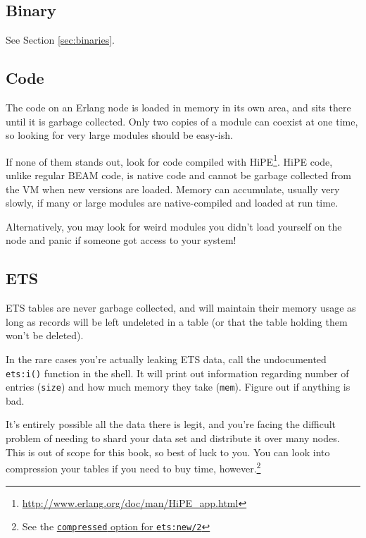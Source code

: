 \documentclass[11pt, oneside]{book}   	%
\newcommand{\function}[1]{\Verb`#1`}
\newcommand{\expression}[1]{\Verb`#1`}
\begin{document}
\subsection{Binary}

See Section \ref{sec:binaries}.

\subsection{Code}

The code on an Erlang node is loaded in memory in its own area, and sits there until it is garbage collected. Only two copies of a module can coexist at one time, so looking for very large modules should be easy-ish.

If none of them stands out, look for code compiled with HiPE\footnote{\href{http://www.erlang.org/doc/man/HiPE\_app.html}{http://www.erlang.org/doc/man/HiPE\_app.html}}. HiPE code, unlike regular BEAM code, is native code and cannot be garbage collected from the VM when new versions are loaded. Memory can accumulate, usually very slowly, if many or large modules are native-compiled and loaded at run time.

Alternatively, you may look for weird modules you didn't load yourself on the node and panic if someone got access to your system!

\subsection{ETS}

ETS tables are never garbage collected, and will maintain their memory usage as long as records will be left undeleted in a table (or that the table holding them won't be deleted).

In the rare cases you're actually leaking ETS data, call the undocumented \function{ets:i()} function in the shell. It will print out information regarding number of entries (\expression{size}) and how much memory they take (\expression{mem}). Figure out if anything is bad.

It's entirely possible all the data there is legit, and you're facing the difficult problem of needing to shard your data set and distribute it over many nodes. This is out of scope for this book, so best of luck to you. You can look into compression your tables if you need to buy time, however.\footnote{See the \href{http://www.erlang.org/doc/man/ets.html\#new-2}{\expression{compressed} option for \function{ets:new/2}}}
\end{document}
